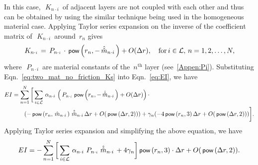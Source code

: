 \documentclass[preprint,12pt,times]{elsarticle}
\newcommand{\plus}[1]{\hat{#1}}
\newcommand{\plusplus}[1]{\plus{\plus{#1}}}
\numberwithin{equation}{section}
\newcommand{\pr}[1]{\left( #1 \right)}
\newcommand{\p}{\,\textsf{\small pow}}
\newcommand{\msubp}[2]{
\IfEqCase{#2}{
      {i}{\, \plus{m}_{#1\cdot #2}\,}%
  }[\,\plus{m}_{#1\cdot {\scriptscriptstyle #2}}\,]}
\newcommand{\msubpp}[2]{
\IfEqCase{#2}{
      {i}{\, \plusplus{m}_{#1\cdot #2}\,}%
  }[\,\plusplus{m}_{#1\cdot {\scriptscriptstyle #2}}\,]}
\newcommand{\alphasub}[2]{
\IfEqCase{#2}{
		{i}{\,\alpha_{ {#1}\cdot { \scriptstyle #2}}\,}%
	}[\,\alpha_{ {#1}\cdot {\scriptscriptstyle #2}}\,]}
\newcommand{\Psub}[2]{\,P_{ {#1}\cdot {\scriptscriptstyle #2}}\,}
\newcommand{\Ksub}[2]{\,K_{ {#1}\cdot {\scriptscriptstyle #2}}\,}
\renewcommand{\>}{$\Rightarrow$}
\begin{document}
In this case,~$\Ksub{n}{i}$ of adjacent layers are not coupled with each other and thus can be obtained by using the similar technique being used in the homogeneous material case. Applying Taylor series expansion on the inverse of the coefficient matrix of~$\Ksub{n}{i}$ around~$r_{n}$ gives
\begin{equation}
	\Ksub{n}{i} = \Psub{n}{i} \cdot \p\pr{r_{n},-\msubpp{n}{i}} + O(\Delta r), \quad \text{for}\, i \in \mathcal{L},\, n = 1,2,\dots,N,
	\label{eq:two_mat_no_friction_Ks}
\end{equation}
where~$\Psub{n}{i}$ are material constants of the~$n^{\text{th}}$ layer (see~\ref{Appen:Pi}).  Substituting Eqn.~\eqref{eq:two_mat_no_friction_Ks} into Eqn.~\eqref{eq:EI}, we have
\begin{equation*}
	\begin{aligned}
	\begin{split}
	EI & = \sum_{n=1}^{N} \bigg[ \sum_{i \in \mathcal{L}} \alphasub{n}{i} \left( \Psub{n}{i} \p\pr{r_{n},-\msubpp{n}{i}} + O(\Delta r) \right) \cdot \\ & \qquad{} (- \p\pr{r_{n},\msubp{n}{i}} \msubpp{n}{i}  \Delta r + O(\p\pr{\Delta r,2}))  + \gamma_{n} (-4 \p\pr{r_{n},3} \Delta r + O(\p\pr{\Delta r,2})) \bigg] .
	\end{split}
	\end{aligned}
\end{equation*}
Applying Taylor series expansion and simplifying the above equation, we have
\begin{equation}
EI = -\sum_{n=1}^{N} \bigg[ \sum_{i \in \mathcal{L}} \alphasub{n}{i} \Psub{n}{i} \msubpp{n}{i} + 4\gamma_{n} \bigg] \p\pr{r_{n},3} \cdot \Delta r + O(\p\pr{\Delta r,2}).
\label{eq:two_mat_no_friction_EI_1}
\end{equation}
\end{document}

